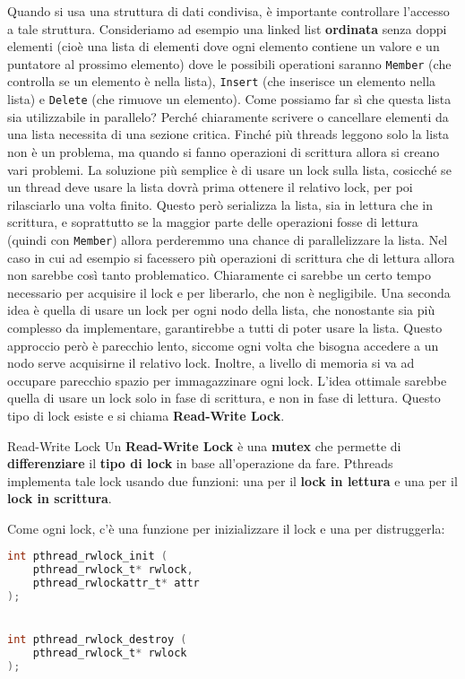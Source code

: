 Quando si usa una struttura di dati condivisa, è importante controllare l'accesso a tale struttura. Consideriamo ad esempio una linked list \textbf{ordinata} senza doppi elementi (cioè una lista di elementi dove ogni elemento contiene un valore e un puntatore al prossimo elemento) dove le possibili operationi saranno \verb|Member| (che controlla se un elemento è nella lista), \verb|Insert| (che inserisce un elemento nella lista) e \verb|Delete| (che rimuove un elemento).
\nl
Come possiamo far sì che questa lista sia utilizzabile in parallelo? Perché chiaramente scrivere o cancellare elementi da una lista necessita di una sezione critica. Finché più threads leggono solo la lista non è un problema, ma quando si fanno operazioni di scrittura allora si creano vari problemi.
\nl
La soluzione più semplice è di usare un lock sulla lista, cosicché se un thread deve usare la lista dovrà prima ottenere il relativo lock, per poi rilasciarlo una volta finito. Questo però serializza la lista, sia in lettura che in scrittura, e soprattutto se la maggior parte delle operazioni fosse di lettura (quindi con \verb|Member|) allora perderemmo una chance di parallelizzare la lista. Nel caso in cui ad esempio si facessero più operazioni di scrittura che di lettura allora non sarebbe così tanto problematico. Chiaramente ci sarebbe un certo tempo necessario per acquisire il lock e per liberarlo, che non è negligibile.
\nl
Una seconda idea è quella di usare un lock per ogni nodo della lista, che nonostante sia più complesso da implementare, garantirebbe a tutti di poter usare la lista. Questo approccio però è parecchio lento, siccome ogni volta che bisogna accedere a un nodo serve acquisirne il relativo lock. Inoltre, a livello di memoria si va ad occupare parecchio spazio per immagazzinare ogni lock.
\nl
L'idea ottimale sarebbe quella di usare un lock solo in fase di scrittura, e non in fase di lettura. Questo tipo di lock esiste e si chiama \textbf{Read-Write Lock}.

\begin{definition}{Read-Write Lock}
    Un \textbf{Read-Write Lock} è una \textbf{mutex} che permette di \textbf{differenziare} il \textbf{tipo di lock} in base all'operazione da fare. Pthreads implementa tale lock usando due funzioni: una per il \textbf{lock in lettura} e una per il \textbf{lock in scrittura}.
\end{definition}

Come ogni lock, c'è una funzione per inizializzare il lock e una per distruggerla:

\begin{codedefine}
    \begin{lstlisting}[language = C, numbers = none]
int pthread_rwlock_init (
    pthread_rwlock_t* rwlock,
    pthread_rwlockattr_t* attr
);


int pthread_rwlock_destroy (
    pthread_rwlock_t* rwlock
);\end{lstlisting}
\tcblower

\end{codedefine}